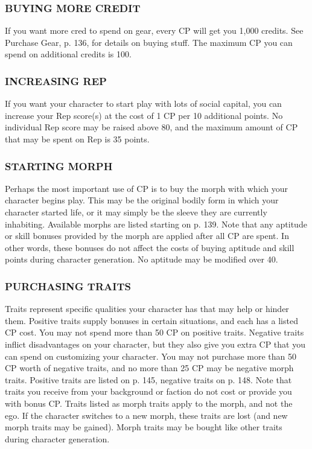 \subsubsection{BUYING MORE CREDIT}
If you want more cred to spend on gear, every CP will get you 1,000
credits. See Purchase Gear, p. 136, for details on buying stuff. The maximum CP
you can spend on additional credits is 100.

\subsubsection{INCREASING REP}
If you want your character to start play with lots of social capital, you can
increase your Rep score(s) at the cost of 1 CP per 10 additional points. No
individual Rep score may be raised above 80, and the maximum amount of CP
that may be spent on Rep is 35 points.

\subsubsection{STARTING MORPH}
Perhaps the most important use of CP is to buy the morph with which your
character begins play. This may be the original bodily form in which your
character started life, or it may simply be the sleeve they are currently
inhabiting.  Available morphs are listed starting on p. 139.  Note that any
aptitude or skill bonuses provided by the morph are applied after all CP are
spent. In other words, these bonuses do not affect the costs of buying aptitude
and skill points during character generation.  No aptitude may be modified over
40.

\subsubsection{PURCHASING TRAITS}
Traits represent specific qualities your character has that may help or hinder
them.  Positive traits supply bonuses in certain situations, and each has a
listed CP cost. You may not spend more than 50 CP on positive traits.  Negative
traits inflict disadvantages on your character, but they also give you extra
CP that you can spend on customizing your character. You may not purchase more
than 50 CP worth of negative traits, and no more than 25 CP may be negative
morph traits.  Positive traits are listed on p. 145, negative traits on
p. 148. Note that traits you receive from your background or faction do not
cost or provide you with bonus CP.  Traits listed as morph traits apply to the
morph, and not the ego. If the character switches to a new morph, these traits
are lost (and new morph traits may be gained). Morph traits may be bought like
other traits during character generation.

